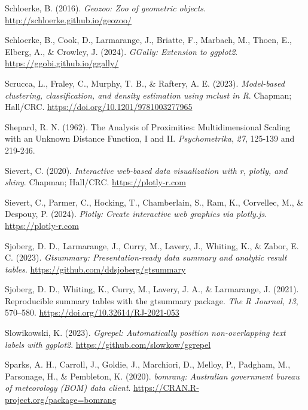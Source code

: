 \documentclass[
  letterpaper,
]{krantz}
\newlength{\cslhangindent}
\newenvironment{CSLReferences}[2] %
 {\begin{list}{}{%
  \setlength{\itemindent}{0pt}
  \setlength{\leftmargin}{0pt}
  \setlength{\parsep}{0pt}
  \ifodd #1
   \setlength{\leftmargin}{\cslhangindent}
   \setlength{\itemindent}{-1\cslhangindent}
  \fi
  \setlength{\itemsep}{#2\baselineskip}}}
 {\end{list}}
\begin{document}
\begin{CSLReferences}{1}{0}
Schloerke, B. (2016). \emph{Geozoo: Zoo of geometric objects}.
\url{http://schloerke.github.io/geozoo/}

Schloerke, B., Cook, D., Larmarange, J., Briatte, F., Marbach, M.,
Thoen, E., Elberg, A., \& Crowley, J. (2024). \emph{GGally: Extension to
ggplot2}. \url{https://ggobi.github.io/ggally/}

Scrucca, L., Fraley, C., Murphy, T. B., \& Raftery, A. E. (2023).
\emph{Model-based clustering, classification, and density estimation
using {mclust} in {R}}. Chapman; Hall/CRC.
\url{https://doi.org/10.1201/9781003277965}

Shepard, R. N. (1962). The {A}nalysis of {P}roximities:
{M}ultidimensional {S}caling with an {U}nknown {D}istance {F}unction,
{I} and {II}. \emph{Psychometrika}, \emph{27}, 125-139 and 219-246.

Sievert, C. (2020). \emph{Interactive web-based data visualization with
r, plotly, and shiny}. Chapman; Hall/CRC. \url{https://plotly-r.com}

Sievert, C., Parmer, C., Hocking, T., Chamberlain, S., Ram, K.,
Corvellec, M., \& Despouy, P. (2024). \emph{Plotly: Create interactive
web graphics via plotly.js}. \url{https://plotly-r.com}

Sjoberg, D. D., Larmarange, J., Curry, M., Lavery, J., Whiting, K., \&
Zabor, E. C. (2023). \emph{Gtsummary: Presentation-ready data summary
and analytic result tables}.
\url{https://github.com/ddsjoberg/gtsummary}

Sjoberg, D. D., Whiting, K., Curry, M., Lavery, J. A., \& Larmarange, J.
(2021). Reproducible summary tables with the gtsummary package.
\emph{{The R Journal}}, \emph{13}, 570--580.
\url{https://doi.org/10.32614/RJ-2021-053}

Slowikowski, K. (2023). \emph{Ggrepel: Automatically position
non-overlapping text labels with ggplot2}.
\url{https://github.com/slowkow/ggrepel}

Sparks, A. H., Carroll, J., Goldie, J., Marchiori, D., Melloy, P.,
Padgham, M., Parsonage, H., \& Pembleton, K. (2020). \emph{{bomrang}:
Australian government bureau of meteorology (BOM) data client}.
\url{https://CRAN.R-project.org/package=bomrang}


\end{CSLReferences}
\end{document}
